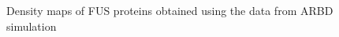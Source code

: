 \documentclass[12ptr]{article}
\begin{document}
\begin{figure}[!ht]
    \centering
    \qquad
    \caption {\small Density maps of FUS proteins obtained using the data from ARBD simulation}
    \label{fig:density}
\end{figure}
 
\end{document}

